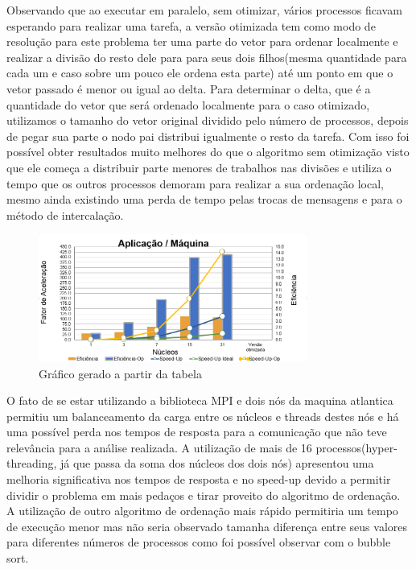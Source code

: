 \documentclass[9pt]{IEEEtran}
\begin{document}
	Observando que ao executar em paralelo, sem otimizar, vários processos
	ficavam esperando para realizar uma tarefa, a versão otimizada tem como modo
	de resolução para este problema ter uma parte do vetor para ordenar
	localmente e realizar a divisão do resto dele para para seus dois
	filhos(mesma quantidade para cada um e caso sobre um pouco ele ordena esta
	parte) até um ponto em que o vetor passado é menor ou igual ao delta. Para
	determinar o delta, que é a quantidade do vetor que será ordenado localmente
	para o caso otimizado, utilizamos o tamanho do vetor original dividido pelo
	número de processos, depois de pegar sua parte o nodo pai distribui
	igualmente o resto da tarefa. Com isso foi possível obter resultados muito
	melhores do que o algoritmo sem otimização visto que ele começa a distribuir
	parte menores de trabalhos nas divisões e utiliza o tempo que os outros
	processos  demoram para realizar a sua ordenação local, mesmo ainda
	existindo uma perda de tempo pelas trocas de mensagens e para o método de
	intercalação.

	\begin{figure}[H]
		\centering
		\includegraphics[width=88mm]{doc/graph.PNG}
		\caption{Gráfico gerado a partir da tabela}
		\label{fig_graph}
	\end{figure}

	O fato de se estar utilizando a biblioteca MPI e dois nós da maquina
	atlantica permitiu um balanceamento da carga entre os núcleos e threads
	destes nós e há uma possível perda nos tempos de resposta para a comunicação
	que não teve relevância para a análise realizada. A utilização de mais de 16
	processos(hyper-threading, já que passa da soma dos núcleos dos dois nós)
	apresentou uma melhoria significativa nos tempos de resposta e no speed-up
	devido a permitir dividir o problema em mais pedaços e tirar proveito do
	algoritmo de ordenação. A utilização de outro algoritmo de ordenação mais
	rápido permitiria um tempo de execução menor mas não seria observado tamanha
	diferença entre seus valores para diferentes números de processos como foi
	possível observar com o bubble sort.
\end{document}
